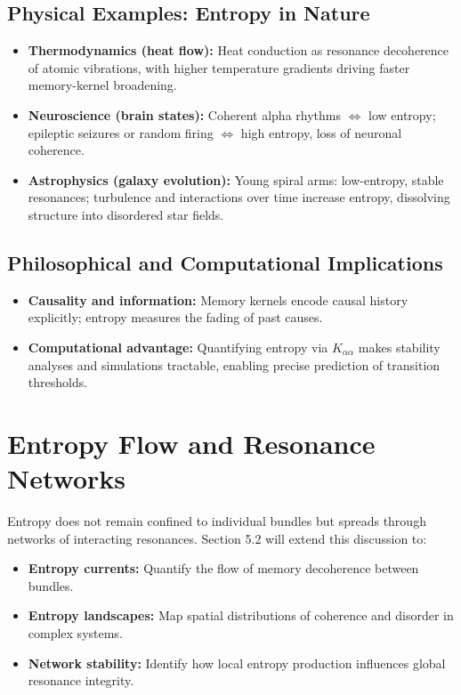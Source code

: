 \subsection{Physical Examples: Entropy in Nature}

\begin{itemize}
  \item \textbf{Thermodynamics (heat flow):}
    Heat conduction as resonance decoherence of atomic vibrations,
    with higher temperature gradients driving faster memory-kernel broadening.

  \item \textbf{Neuroscience (brain states):}
    Coherent alpha rhythms \(\Leftrightarrow\) low entropy;
    epileptic seizures or random firing \(\Leftrightarrow\) high entropy, loss of neuronal coherence.

  \item \textbf{Astrophysics (galaxy evolution):}
    Young spiral arms: low-entropy, stable resonances;
    turbulence and interactions over time increase entropy, dissolving structure into disordered star fields.
\end{itemize}


\subsection{Philosophical and Computational Implications}

\begin{itemize}
  \item \textbf{Causality and information:}
    Memory kernels encode causal history explicitly;
    entropy measures the fading of past causes.
  \item \textbf{Computational advantage:}
    Quantifying entropy via \(K_{\alpha\alpha}\) makes stability analyses and simulations tractable,
    enabling precise prediction of transition thresholds.
\end{itemize}

\section{Entropy Flow and Resonance Networks }

Entropy does not remain confined to individual bundles but spreads through networks of interacting resonances.  Section 5.2 will extend this discussion to:

\begin{itemize}
  \item \textbf{Entropy currents:} Quantify the flow of memory decoherence between bundles.
  \item \textbf{Entropy landscapes:} Map spatial distributions of coherence and disorder in complex systems.
  \item \textbf{Network stability:} Identify how local entropy production influences global resonance integrity.
\end{itemize}

